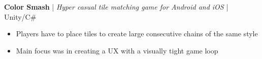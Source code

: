 \item \textbf{Color Smash} | \textit{Hyper casual tile matching game for Android and iOS} | Unity/C\#
\begin{itemize}
    \item Players have to place tiles to create large consecutive chains of the same style
    \item Main focus was in creating a UX with a visually tight game loop
\end{itemize}
